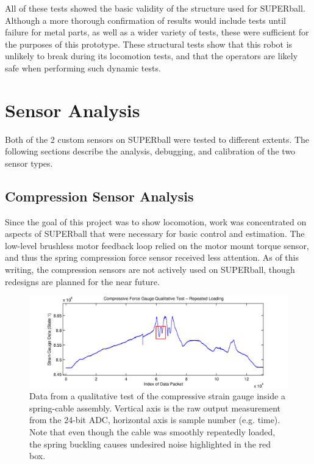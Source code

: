\documentclass[12pt]{report}
\begin{document}
All of these tests showed the basic validity of the structure used for SUPERball.
Although a more thorough confirmation of results would include tests until failure for metal parts, as well as a wider variety of tests, these were sufficient for the purposes of this prototype.
These structural tests show that this robot is unlikely to break during its locomotion tests, and that the operators are likely safe when performing such dynamic tests.


\section{Sensor Analysis}

Both of the 2 custom sensors on SUPERball were tested to different extents.
The following sections describe the analysis, debugging, and calibration of the two sensor types.

\subsection{Compression Sensor Analysis}


Since the goal of this project was to show locomotion, work was concentrated on aspects of SUPERball that were necessary for basic control and estimation.
The low-level brushless motor feedback loop relied on the motor mount torque sensor, and thus the spring compression force sensor received less attention.
As of this writing, the compression sensors are not actively used on SUPERball, though redesigns are planned for the near future.

\begin{figure}[thpb]
      \centering
      \includegraphics[width=0.9\columnwidth]{img/rodtest_slow.jpg}
      \caption{Data from a qualitative test of the compressive strain gauge inside a spring-cable assembly. Vertical axis is the raw output measurement from the 24-bit ADC, horizontal axis is sample number (e.g. time). Note that even though the cable was smoothly repeatedly loaded, the spring buckling causes undesired noise highlighted in the red box.}
      \label{fig:compression_sensor_data}
      \vspace{-0.2cm}
\end{figure}
\end{document}
